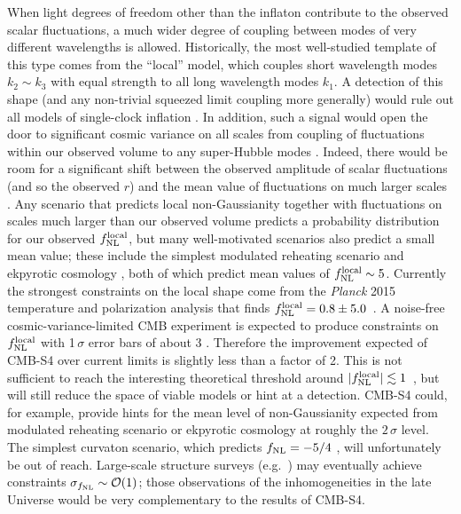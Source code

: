 When light degrees of freedom other than the inflaton contribute to the observed scalar fluctuations, a much wider degree of coupling between modes of very different wavelengths is allowed. Historically, the most well-studied template of this type comes from the ``local'' model, which couples short wavelength modes $k_2\sim k_3$ with equal strength to all long wavelength modes $k_1$. A detection of this shape (and any non-trivial squeezed limit coupling more generally) would rule out all models of single-clock inflation \cite{Creminelli:2004yq}. In addition, such a signal would open the door to significant cosmic variance on all scales from coupling of fluctuations within our observed volume to any super-Hubble modes \cite{Nelson:2012sb,LoVerde:2013xka,Nurmi:2013xv}. Indeed, there would be room for a significant shift between the observed amplitude of scalar fluctuations (and so the observed $r$) and the mean value of fluctuations on much larger scales \cite{Bonga:2015urq}. Any scenario that predicts local non-Gaussianity together with fluctuations on scales much larger than our observed volume predicts a probability distribution for our observed $f_{\rm NL}^{\rm local}$, but many well-motivated scenarios also predict a small mean value; these include the simplest modulated reheating scenario \cite{Zaldarriaga:2003my} and ekpyrotic cosmology \cite{Lehners:2009ja}, both of which predict mean values of $f_{\rm NL}^{\rm local}\sim5$. 
Currently the strongest constraints on the local shape come from the {\it Planck\/} 2015 temperature and polarization analysis that finds $f_{\rm NL}^{\rm local} = 0.8 \pm 5.0$~\cite{Ade:2015ava}. A noise-free cosmic-variance-limited CMB experiment is expected to produce constraints on $f_{\rm NL}^{\rm local}$ with 1$\,\sigma$ error bars of about 3 \cite{Komatsu:2001rj}. Therefore the improvement expected of CMB-S4 over current limits is slightly less than a factor of 2. This is not sufficient to reach the interesting theoretical threshold around $|f_{\rm NL}^{\rm local}|\lesssim 1$~\cite{Alvarez:2014vva}, but will still reduce the space of viable models or hint at a detection. CMB-S4 could, for example, provide hints for the mean level of non-Gaussianity expected from modulated reheating scenario or ekpyrotic cosmology at roughly the $2\,\sigma$ level. The simplest curvaton scenario, which predicts $f_{\rm NL} = -5/4$ \cite{Lyth:2001nq}, will unfortunately be out of reach. Large-scale structure surveys (e.g.\ \cite{Dore:2014cca}) may eventually achieve constraints $\sigma_{f_{\rm NL}}\sim\mathcal{O}(1)$; those observations of the inhomogeneities in the late Universe would be very complementary to the results of CMB-S4.


